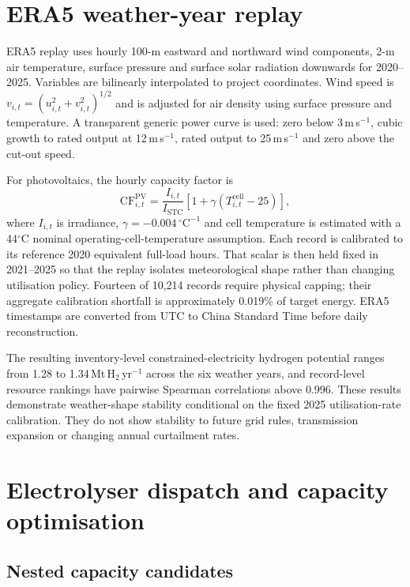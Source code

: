 \documentclass[11pt,a4paper]{article}
\begin{document}
\section{ERA5 weather-year replay}\label{sec:era5}

ERA5 replay uses hourly 100-m eastward and northward wind components, 2-m air temperature, surface pressure and surface solar radiation downwards for 2020--2025\cite{hersbach2020,era5data}. Variables are bilinearly interpolated to project coordinates. Wind speed is $v_{i,t}=(u_{i,t}^2+v_{i,t}^2)^{1/2}$ and is adjusted for air density using surface pressure and temperature. A transparent generic power curve is used: zero below 3\,m\,s$^{-1}$, cubic growth to rated output at 12\,m\,s$^{-1}$, rated output to 25\,m\,s$^{-1}$ and zero above the cut-out speed.

For photovoltaics, the hourly capacity factor is
\begin{equation}
\mathrm{CF}^{\mathrm{PV}}_{i,t}=\frac{I_{i,t}}{I_{\mathrm{STC}}}
\left[1+\gamma\left(T^{\mathrm{cell}}_{i,t}-25\right)\right],
\label{eq:pv}
\end{equation}
where $I_{i,t}$ is irradiance, $\gamma=-0.004\,^{\circ}\mathrm{C}^{-1}$ and cell temperature is estimated with a 44$^{\circ}$C nominal operating-cell-temperature assumption. Each record is calibrated to its reference 2020 equivalent full-load hours. That scalar is then held fixed in 2021--2025 so that the replay isolates meteorological shape rather than changing utilisation policy. Fourteen of 10,214 records require physical capping; their aggregate calibration shortfall is approximately 0.019\% of target energy. ERA5 timestamps are converted from UTC to China Standard Time before daily reconstruction.

The resulting inventory-level constrained-electricity hydrogen potential ranges from 1.28 to 1.34\,Mt\,H$_2$\,yr$^{-1}$ across the six weather years, and record-level resource rankings have pairwise Spearman correlations above 0.996. These results demonstrate weather-shape stability conditional on the fixed 2025 utilisation-rate calibration. They do not show stability to future grid rules, transmission expansion or changing annual curtailment rates.

\section{Electrolyser dispatch and capacity optimisation}\label{sec:capacity}

\subsection{Nested capacity candidates}
\end{document}
